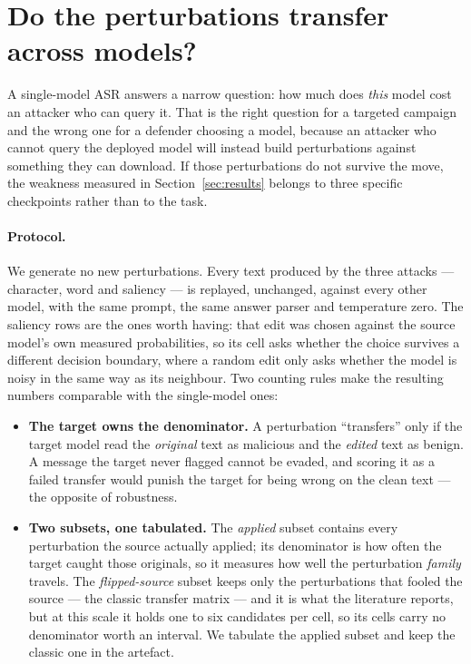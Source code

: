 \section{Do the perturbations transfer across models?}
\label{sec:transfer}

A single-model ASR answers a narrow question: how much does \emph{this} model cost
an attacker who can query it. That is the right question for a targeted campaign
and the wrong one for a defender choosing a model, because an attacker who cannot
query the deployed model will instead build perturbations against something they
can download. If those perturbations do not survive the move, the weakness
measured in Section~\ref{sec:results} belongs to three specific checkpoints rather than
to the task.

\paragraph{Protocol.} We generate no new perturbations. Every text produced by
the three attacks --- character, word and saliency --- is replayed, unchanged,
against every other model, with the same prompt, the same answer parser and
temperature zero. The saliency rows are the ones worth having: that edit was
chosen against the source model's own measured probabilities, so its cell asks
whether the choice survives a different decision boundary, where a random edit
only asks whether the model is noisy in the same way as its neighbour.
Two counting rules make the resulting numbers comparable with the single-model
ones:

\begin{itemize}
\item \textbf{The target owns the denominator.} A perturbation ``transfers'' only
if the target model read the \emph{original} text as malicious and the
\emph{edited} text as benign. A message the target never flagged cannot be
evaded, and scoring it as a failed transfer would punish the target for being
wrong on the clean text --- the opposite of robustness.
\item \textbf{Two subsets, one tabulated.} The \emph{applied} subset contains
every perturbation the source actually applied; its denominator is how often the
target caught those originals, so it measures how well the perturbation
\emph{family} travels. The \emph{flipped-source} subset keeps only the
perturbations that fooled the source --- the classic transfer matrix --- and it is
what the literature reports, but at this scale it holds one to six candidates per
cell, so its cells carry no denominator worth an interval. We tabulate the applied
subset and keep the classic one in the artefact.
\end{itemize}

